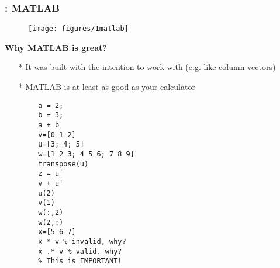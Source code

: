 \documentclass[11pt]{beamer}
\begin{document}
\begin{frame}[fragile=singleslide]
	
	\frametitle{\secname: MATLAB}
	\centering
	\begin{minipage}[t]{0.5\linewidth}
		\vspace{-15pt}
		\begin{figure}[h!]
			\centering
			\texttt{[image: figures/1matlab]}
		\end{figure}
		\vspace{-7pt}
		\textbf{Why MATLAB is great?}
		\begin{itemize}
			\setlength{\itemsep}{0pt}
			\item[*] It was built with the intention to work with  (e.g. like column vectors)
			\item[*] MATLAB is at least as good as your calculator
		\end{itemize}
	\end{minipage}
	\begin{minipage}[t]{0.45\linewidth}
		\vspace{-15pt}
		\begin{verbatim}
		a = 2;
		b = 3;
		a + b
		v=[0 1 2]
		u=[3; 4; 5]
		w=[1 2 3; 4 5 6; 7 8 9]
		transpose(u)
		z = u'
		v + u'
		u(2)		
		v(1)
		w(:,2)
		w(2,:)
		x=[5 6 7]
		x * v % invalid, why?
		x .* v % valid. why? 
		% This is IMPORTANT!
		\end{verbatim}
	\end{minipage}
	
\end{frame}
\end{document}
